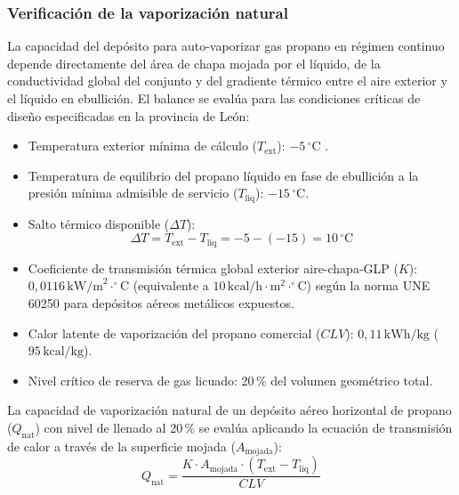 \documentclass[12pt]{article}
\begin{document}
        \subsubsection{Verificación de la vaporización natural}
        La capacidad del depósito para auto-vaporizar gas propano en régimen continuo depende directamente del área de chapa mojada por el líquido, de la conductividad global del conjunto y del gradiente térmico entre el aire exterior y el líquido en ebullición. El balance se evalúa para las condiciones críticas de diseño especificadas en la provincia de León:
        \begin{itemize}
            \item Temperatura exterior mínima de cálculo ($T_{\text{ext}}$): $-5\,^{\circ}\text{C}$ \cite{idaeclima}.
            \item Temperatura de equilibrio del propano líquido en fase de ebullición a la presión mínima admisible de servicio ($T_{\text{liq}}$): $-15\,^{\circ}\text{C}$.
            \item Salto térmico disponible ($\Delta T$): 
            \begin{equation}
                \Delta T = T_{\text{ext}} - T_{\text{liq}} = -5 - (-15) = 10\,^{\circ}\text{C}
            \end{equation}
            \item Coeficiente de transmisión térmica global exterior aire-chapa-GLP ($K$): $0,0116\,\text{kW/m}^2\cdot^{\circ}\text{C}$ (equivalente a $10\,\text{kcal/h}\cdot\text{m}^2\cdot^{\circ}\text{C}$) según la norma UNE 60250 \cite{une60250} para depósitos aéreos metálicos expuestos.
            \item Calor latente de vaporización del propano comercial ($CLV$): $0,11\,\text{kWh/kg}$ ($95\,\text{kcal/kg}$).
            \item Nivel crítico de reserva de gas licuado: 20\,\% del volumen geométrico total.
        \end{itemize}

        La capacidad de vaporización natural de un depósito aéreo horizontal de propano ($Q_{\text{nat}}$) con nivel de llenado al 20\,\% se evalúa aplicando la ecuación de transmisión de calor a través de la superficie mojada ($A_{\text{mojada}}$):
        \begin{equation}
            Q_{\text{nat}} = \frac{K \cdot A_{\text{mojada}} \cdot (T_{\text{ext}} - T_{\text{liq}})}{CLV}
        \end{equation}
\end{document}
